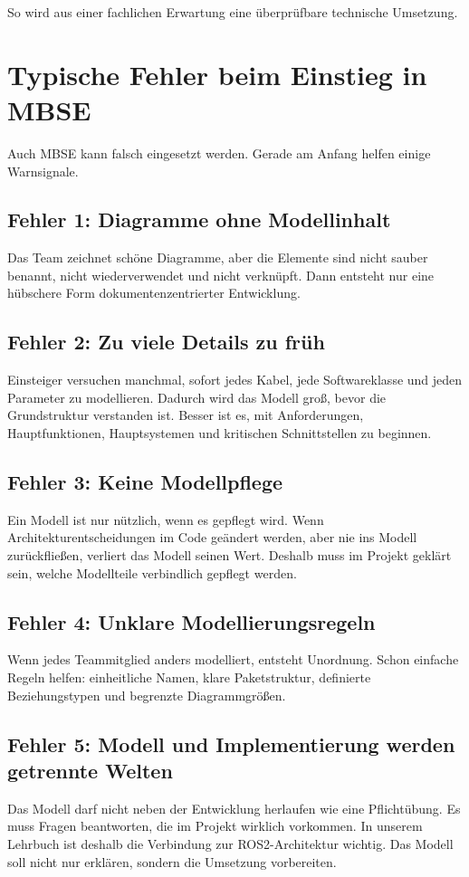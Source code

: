 So wird aus einer fachlichen Erwartung eine überprüfbare technische Umsetzung.

\section{Typische Fehler beim Einstieg in MBSE}
Auch MBSE kann falsch eingesetzt werden. Gerade am Anfang helfen einige Warnsignale.

\subsection{Fehler 1: Diagramme ohne Modellinhalt}
Das Team zeichnet schöne Diagramme, aber die Elemente sind nicht sauber benannt, nicht wiederverwendet und nicht verknüpft. Dann entsteht nur eine hübschere Form dokumentenzentrierter Entwicklung.

\subsection{Fehler 2: Zu viele Details zu früh}
Einsteiger versuchen manchmal, sofort jedes Kabel, jede Softwareklasse und jeden Parameter zu modellieren. Dadurch wird das Modell groß, bevor die Grundstruktur verstanden ist. Besser ist es, mit Anforderungen, Hauptfunktionen, Hauptsystemen und kritischen Schnittstellen zu beginnen.

\subsection{Fehler 3: Keine Modellpflege}
Ein Modell ist nur nützlich, wenn es gepflegt wird. Wenn Architekturentscheidungen im Code geändert werden, aber nie ins Modell zurückfließen, verliert das Modell seinen Wert. Deshalb muss im Projekt geklärt sein, welche Modellteile verbindlich gepflegt werden.

\subsection{Fehler 4: Unklare Modellierungsregeln}
Wenn jedes Teammitglied anders modelliert, entsteht Unordnung. Schon einfache Regeln helfen: einheitliche Namen, klare Paketstruktur, definierte Beziehungstypen und begrenzte Diagrammgrößen.

\subsection{Fehler 5: Modell und Implementierung werden getrennte Welten}
Das Modell darf nicht neben der Entwicklung herlaufen wie eine Pflichtübung. Es muss Fragen beantworten, die im Projekt wirklich vorkommen. In unserem Lehrbuch ist deshalb die Verbindung zur ROS2-Architektur wichtig. Das Modell soll nicht nur erklären, sondern die Umsetzung vorbereiten.

